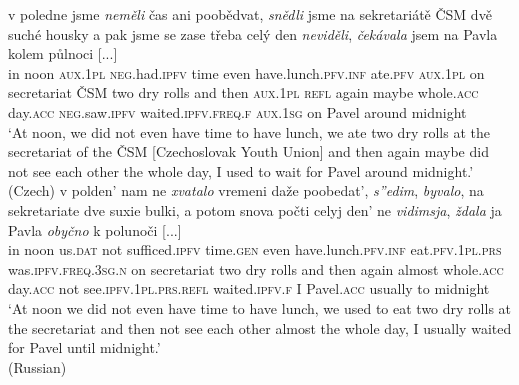 \documentclass[output=paper,colorlinks,citecolor=brown]{langscibook}
\begin{document}
\ea\label{ex:naglprim}
\ea\label{ex:cekavala} 
\gll [...] v poledne jsme \textit{neměli} čas ani poobědvat, \textit{snědli} jsme na sekretariátě ČSM dvě suché housky a pak jsme se zase třeba celý den \textit{neviděli}, \textit{čekávala} jsem na Pavla kolem půlnoci [...]\\
{} in noon \textsc{aux.1pl} \textsc{neg}.had.\textsc{ipfv} time even have.lunch.\textsc{pfv.inf} ate.\textsc{pfv} \textsc{aux.1pl} on secretariat ČSM two dry rolls and then \textsc{aux.1pl} \textsc{refl} again maybe whole.\textsc{acc} day.\textsc{acc} \textsc{neg}.saw.\textsc{ipfv} waited.\textsc{ipfv.freq.f} \textsc{aux.1sg} on Pavel around midnight \\
\glt `At noon, we did not even have time to have lunch, we ate two dry rolls at the secretariat of the ČSM [Czechoslovak Youth Union] and then again maybe did not see each other the whole day, I used to wait for Pavel around midnight.' \hfill (Czech)%
\ex 
\gll [...] v polden' nam ne \textit{xvatalo} vremeni daže poobedat', \textit{s''edim}, \textit{byvalo}, na sekretariate dve suxie bulki, a potom snova počti celyj den' ne \textit{vidimsja}, \textit{ždala} ja Pavla \textit{obyčno} k polunoči [...]\\
{} in noon us.\textsc{dat} not sufficed.\textsc{ipfv} time.\textsc{gen} even have.lunch.\textsc{pfv.inf} eat.\textsc{pfv.1pl.prs} was.\textsc{ipfv.freq.3sg.n} on secretariat two dry rolls and then again almost whole.\textsc{acc} day.\textsc{acc} not see.\textsc{ipfv.1pl.prs.refl} waited.\textsc{ipfv.f} I Pavel.\textsc{acc} usually to midnight\\
\glt `At noon we did not even have time to have lunch, we used to eat two dry rolls at the secretariat and then not see each other almost the whole day, I usually waited for Pavel until midnight.' \\\hfill (Russian)
\z 
\z 
\end{document}
